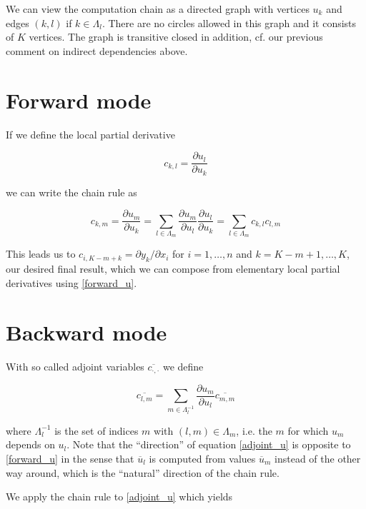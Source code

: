 \documentclass{amsart}
\theoremstyle{plain}
\numberwithin{equation}{section}
\begin{document}
We can view the computation chain as a directed graph with vertices $u_k$ and edges $(k,l)$ if $k\in\Lambda_{l}$. There are no circles allowed in this graph and it consists of $K$ vertices. The graph is transitive closed in addition, cf. our previous comment on indirect dependencies above.

\section{Forward mode}

If we define the local partial derivative

\begin{equation}
c_{k,l} = \frac{\partial u_l}{\partial u_k}
\end{equation}

we can write the chain rule as

\begin{equation}\label{forward_u}
c_{k,m} = \frac{\partial u_m}{\partial u_k} = \sum_{l\in\Lambda_m} \frac{\partial u_m}{\partial u_l} \frac{\partial u_l}{\partial u_k} = \sum_{l\in\Lambda_m} c_{k,l}c_{l,m}
\end{equation}

This leads us to $c_{i,K-m+k} = \partial{y_k} / \partial{x_i}$ for $i=1,\dots,n$ and $k=K-m+1,\dots,K$, our desired final result, which we can compose from elementary local partial derivatives using \ref{forward_u}.

\section{Backward mode}

With so called adjoint variables $\overline{c_{\cdot,\cdot}}$ we define

\begin{equation}\label{adjoint_u}
\overline{c_{l,m}} = \sum_{m\in\Lambda^{-1}_l} \frac{\partial u_m}{\partial u_l} \overline{c_{m,m}} 
\end{equation}

where $\Lambda^{-1}_l$ is the set of indices $m$ with $(l,m)\in\Lambda_m$, i.e. the $m$ for which $u_m$ depends on $u_l$. Note that the ``direction'' of equation \ref{adjoint_u} is opposite to \ref{forward_u} in the sense that $\overline{u}_l$ is computed from values $\overline{u}_m$ instead of the other way around, which is the ``natural'' direction of the chain rule.

We apply the chain rule to \ref{adjoint_u} which yields
\end{document}
